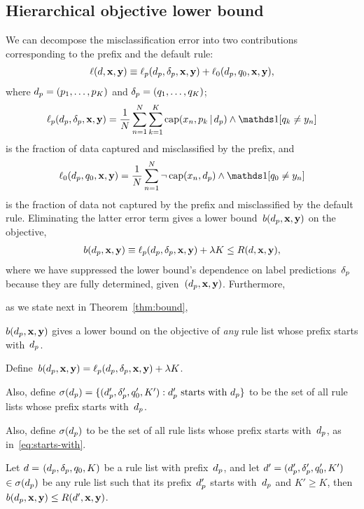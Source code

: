 \subsection{Hierarchical objective lower bound}
\label{sec:hierarchical}

We can decompose the misclassification error into two contributions
corresponding to the prefix and the default rule:
\begin{align}
\Loss(\RL, \x, \y) %
\equiv \Loss_p(\Prefix, \Labels, \x, \y) + \Loss_0(\Prefix, \Default, \x, \y),
\end{align}
where ${d_p = (p_1, \dots, p_K)}$ and ${\delta_p = (q_1, \dots, q_K)}$;
\begin{align}
\Loss_p(\Prefix, \Labels, \x, \y) =
\frac{1}{N} \sum_{n=1}^N \sum_{k=1}^K \Cap(x_n, p_k \given \Prefix) \wedge \one [ q_k \neq y_n ]
\label{eq:loss}
\end{align}
is the fraction of data captured and misclassified by the prefix, and
\begin{align}
\Loss_0(\Prefix, \Default, \x, \y) =
\frac{1}{N} \sum_{n=1}^N \neg\, \Cap(x_n, \Prefix) \wedge \one [ \Default \neq y_n ]
\end{align}
is the fraction of data not captured by the prefix and misclassified by the default rule.
%
Eliminating the latter error term gives a lower bound~$b(d_p, \mathbf{x}, \mathbf{y})$ on the objective,
\begin{align}
b(d_p, \mathbf{x}, \mathbf{y}) \equiv \ell_p(d_p, \delta_p, \mathbf{x}, \mathbf{y}) + {\lambda} K \le R({d}, \mathbf{x}, \mathbf{y}),
\label{eq:lower-bound}
\end{align}
where we have suppressed the lower bound's dependence on label predictions~$\delta_p$
because they are fully determined, given~${(d_p, \mathbf{x}, \mathbf{y})}$.
%
Furthermore,
\begin{arxiv}
as we state next in Theorem~\ref{thm:bound},
\end{arxiv}
$b(d_p, \mathbf{x}, \mathbf{y})$ gives a lower bound on the objective of
\emph{any} rule list whose prefix starts with~$d_p$.

\begin{theorem}
Define~${b(d_p, \mathbf{x}, \mathbf{y}) = \ell_p(d_p, \delta_p, \mathbf{x}, \mathbf{y}) + {\lambda} K}$.
%
\begin{arxiv}
Also, define
${\sigma(d_p) = \{(d_p', \delta_p', q_0', K') : d_p' \textnormal{ starts with } d_p \}}$
to be the set of all rule lists whose prefix starts with~$d_p$.
\end{arxiv}
\begin{kdd}
Also, define $\sigma(d_p)$
to be the set of all rule lists whose prefix starts with~$d_p$,
as in~\eqref{eq:starts-with}.
\end{kdd}
%
Let ${{d} = }$ ${(d_p, \delta_p, q_0, K)}$ be a rule list
with prefix~$d_p$, and let
${{d}' = (d_p', \delta_p', q_0', K')}$ $\in \sigma(d_p)$
be any rule list such that its prefix~$d_p'$ starts with~$d_p$
and ${K' \ge K}$, then ${b(d_p, \mathbf{x}, \mathbf{y}) \le R({d}', \mathbf{x}, \mathbf{y})}$.
\label{thm:bound}
\end{theorem}

